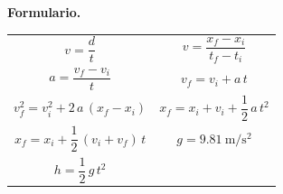 \documentclass[12pt, letter]{exam}
\begin{document}
\newpage
\textbf{\huge{Formulario.}}
\begin{table}[H]
    \centering
    \setlength{\tabcolsep}{40pt}
    \renewcommand{\arraystretch}{2.5}
    \begin{tabular}{c  c}
            $v = \dfrac{d}{t}$ & $v = \dfrac{x_{f} - x_{i}}{t_{f} - t_{i}}$ \\
            $a = \dfrac{v_{f} - v_{i}}{t}$ & $v_{f} = v_{i} + a \, t$ \\
            $v_{f}^{2} = v_{i}^{2} + 2 \, a \, \left(x_{f} - x_{i} \right)$ & $x_{f} = x_{i} + v_{i} + \dfrac{1}{2} \, a \, t^{2}$ \\
            $x_{f} = x_{i} + \dfrac{1}{2} \, \left(v_{i} + v_{f} \right) \, t$ & $g = \SI{9.81}{\meter\per\square\second}$ \\
            $h =\dfrac{1}{2} \,g \, t^{2}$ & \\
\end{tabular}
\end{table}
\end{document}
